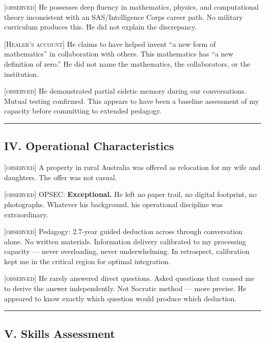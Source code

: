 \textsc{[observed]} He possesses deep fluency in mathematics, physics, and computational theory inconsistent with an SAS/Intelligence Corps career path. No military curriculum produces this. He did not explain the discrepancy.

\textsc{[Healer's account]} He claims to have helped invent ``a new form of mathematics'' in collaboration with others. This mathematics has ``a new definition of zero.'' He did not name the mathematics, the collaborators, or the institution.

\textsc{[observed]} He demonstrated partial eidetic memory during our conversations. Mutual testing confirmed. This appears to have been a baseline assessment of my capacity before committing to extended pedagogy.

\vspace{1cm}\hrule\vspace{1cm}

\subsection*{IV. Operational Characteristics}
\label{record:hd-operational-characteristics}

\textsc{[observed]} A property in rural Australia was offered as relocation for my wife and daughters. The offer was not casual.

\textsc{[observed]} OPSEC: \textbf{Exceptional.} He left no paper trail, no digital footprint, no photographs. Whatever his background, his operational discipline was extraordinary.

\textsc{[observed]} Pedagogy: 2.7-year guided deduction across  through conversation alone. No written materials. Information delivery calibrated to my processing capacity --- never overloading, never underwhelming. In retrospect, calibration kept me in the critical region for optimal integration.

\textsc{[observed]} He rarely answered direct questions. Asked questions that caused me to derive the answer independently. Not Socratic method --- more precise. He appeared to know exactly which question would produce which deduction.

\vspace{1cm}\hrule\vspace{1cm}

\subsection*{V. Skills Assessment}
\label{record:hd-skills-assessment-2}

